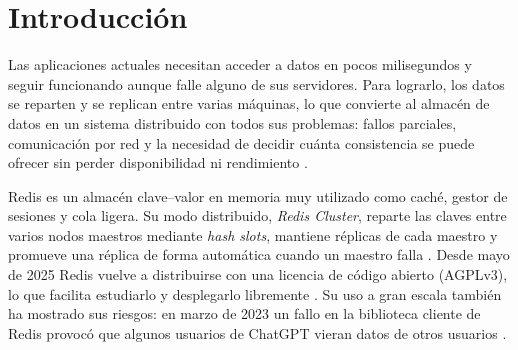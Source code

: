\documentclass[11pt,a4paper]{article}
\begin{document}
\begin{abstract}
Este informe analiza Redis Cluster como sistema distribuido a partir de los conceptos de la Unidad~1 de Aplicaciones Distribuidas y lo compara con Hazelcast. Se desplegó con Docker un clúster de seis nodos Redis 8, con tres maestros y tres réplicas, y se provocó la caída de un nodo maestro: el clúster detectó el fallo y promovió a su réplica en 7.8 segundos, conservó el dato almacenado y pasó brevemente por un estado de fallo global. El análisis muestra que Redis Cluster ofrece transparencias de distribución parciales, combina la comunicación petición–respuesta con los clientes y el gossip entre nodos, y se comporta como un sistema PA/EL, porque su replicación asíncrona puede perder escrituras ya confirmadas; por ello se cuestiona su clasificación como sistema CP en la literatura. Dos ejemplos del entorno propio, un conflicto entre réplicas en Git y el acceso al sitio web de la UTEQ sin red, ilustran los mismos compromisos. La comparación documental indica que Hazelcast favorece la durabilidad con copias de respaldo síncronas y ofrece consistencia fuerte opcional con Raft. Se concluye que Redis Cluster es adecuado para datos rápidos y reconstruibles, pero no para datos críticos.

\noindent\textbf{Palabras clave:} Redis Cluster, Hazelcast, sistemas distribuidos, CAP, PACELC, tolerancia a fallos, replicación.
\end{abstract}

\tableofcontents
\newpage

\section{Introducción}

Las aplicaciones actuales necesitan acceder a datos en pocos milisegundos y
seguir funcionando aunque falle alguno de sus servidores. Para lograrlo, los
datos se reparten y se replican entre varias máquinas, lo que convierte al
almacén de datos en un sistema distribuido con todos sus problemas: fallos
parciales, comunicación por red y la necesidad de decidir cuánta consistencia
se puede ofrecer sin perder disponibilidad ni rendimiento
\cite{vansteen2023distributed, ahmed2023consistency}.

Redis es un almacén clave--valor en memoria muy utilizado como caché, gestor
de sesiones y cola ligera. Su modo distribuido, \emph{Redis Cluster}, reparte
las claves entre varios nodos maestros mediante \emph{hash slots}, mantiene
réplicas de cada maestro y promueve una réplica de forma automática cuando un
maestro falla \cite{redis2026clusterspec, redis2026scaling}. Desde mayo de 2025
Redis vuelve a distribuirse con una licencia de código abierto (AGPLv3), lo que
facilita estudiarlo y desplegarlo libremente \cite{trollope2025agpl}. Su uso a
gran escala también ha mostrado sus riesgos: en marzo de 2023 un fallo en la
biblioteca cliente de Redis provocó que algunos usuarios de ChatGPT vieran
datos de otros usuarios \cite{openai2023outage}.
\end{document}

